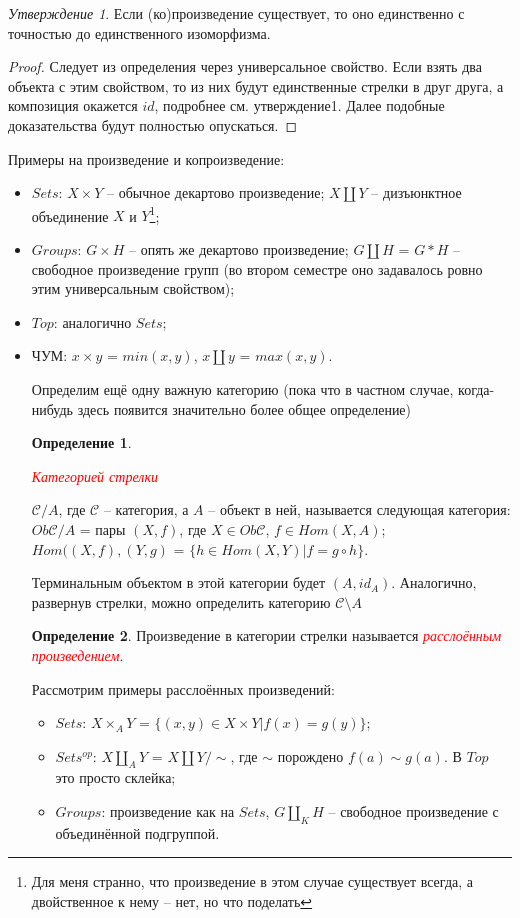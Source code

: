 \documentclass[a4paper]{article}
\theoremstyle{indented}
\theoremstyle{definition}
\newtheorem{defn}{Определение}
\theoremstyle{remark}
\newtheorem{stat}{Утверждение}
\begin{document}
\begin{stat}
Если (ко)произведение существует, то оно единственно с точностью до единственного изоморфизма.
\end{stat}
\begin{proof}
Следует из определения через универсальное свойство. Если взять два объекта с этим свойством, то из них будут единственные стрелки в друг друга, а композиция окажется $id$, подробнее см. утверждение1. Далее подобные доказательства будут полностью опускаться.
\end{proof}
\newpage
Примеры на произведение и копроизведение:\begin{itemize}
\item $Sets$: $X\times Y$ -- обычное декартово произведение; $X\amalg Y$ -- дизъюнктное объединение $X$ и $Y$\footnote{Для меня странно, что произведение в этом случае существует всегда, а двойственное к нему -- нет, но что поделать};
\item $Groups$: $G\times H$ -- опять же декартово произведение; $G\amalg H$ = $G\ast H$ -- свободное произведение групп (во втором семестре оно задавалось ровно этим универсальным свойством);
\item $Top$: аналогично $Sets$;
\item ЧУМ: $x\times y$ = $min(x, y)$, $x\amalg y$ = $max(x, y)$.

Определим ещё одну важную категорию (пока что в частном случае, когда-нибудь здесь появится значительно более общее определение)
\begin{defn}
\hypertarget{n7}{\textcolor{red}{\textit{Категорией стрелки}}} $\mathcal{C}/A$, где $\mathcal{C}$ -- категория, а $A$ -- объект в ней, называется следующая категория: $Ob\mathcal{C}/A$ = пары $(X, f)$, где $X\in Ob\mathcal{C}$, $f\in Hom(X, A)$; $Hom((X, f), (Y, g)$ = $\lbrace h\in Hom(X, Y) \vert f = g\circ h \rbrace$. 
\end{defn}

Терминальным объектом в этой категории будет $(A, id_{A})$. Аналогично, развернув стрелки, можно определить категорию $\mathcal{C}\setminus A$

\begin{defn}
Произведение в категории стрелки называется \hypertarget{n8}{\textcolor{red}{\textit{расслоённым произведением}}}.
\end{defn}
Рассмотрим примеры расслоённых произведений: \begin{itemize}
\item $Sets$: $X\times _{A} Y$ = $\lbrace(x, y) \in X\times Y\vert f(x)=g(y)\rbrace$;
\item $Sets^{op}$: $X\amalg _{A} Y$ = $X\amalg Y / \sim$, где $\sim$ порождено $f(a) \sim g(a)$. В $Top$ это просто склейка;
\item $Groups$: произведение как на $Sets$, $G\amalg _{K} H$ -- свободное произведение с объединённой подгруппой.
\end{itemize}


\end{itemize}
\end{document}
